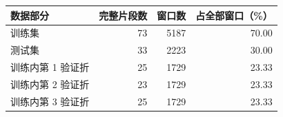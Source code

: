 \begin{tabular}{lrrr}
\toprule
数据部分 & 完整片段数 & 窗口数 & 占全部窗口（\%） \\
\midrule
训练集 & 73 & 5187 & 70.00 \\
测试集 & 33 & 2223 & 30.00 \\
训练内第 1 验证折 & 25 & 1729 & 23.33 \\
训练内第 2 验证折 & 23 & 1729 & 23.33 \\
训练内第 3 验证折 & 25 & 1729 & 23.33 \\
\bottomrule
\end{tabular}
